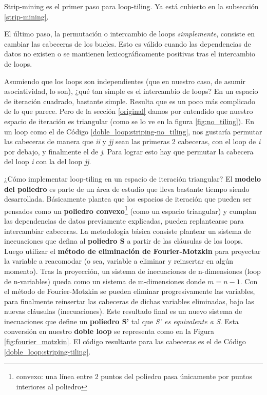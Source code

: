 \documentclass{article}
\begin{document}
Strip-mining es el primer paso para loop-tiling. Ya está cubierto en la subsección \ref{strip-mining}.


El último paso, la permutación o intercambio de loops \textit{simplemente}, consiste en cambiar las cabeceras de los bucles.
Esto es válido cuando las dependencias de datos no existen o se mantienen lexicográficamente positivas
tras el intercambio de loops.


Asumiendo que los loops son independientes (que en nuestro caso, de asumir asociatividad, lo son),
¿qué tan simple es el intercambio de loops? En un espacio de iteración cuadrado, bastante simple. Resulta
que es un poco más complicado de lo que parece. Pero de la sección \ref{original} damos por entendido que
nuestro espacio de iteración es triangular (como se lo ve en la figura \ref{fig:no_tiling}).
En un loop como el de Código \ref{doble_loop:striping-no_tiling}, nos gustaría permutar las cabeceras de manera que
\textit{ii} y \textit{jj} sean las primeras 2 cabeceras, con el loop de \textit{i} por debajo, y finalmente
el de \textit{j}. Para lograr esto hay que permutar la cabecera del loop \textit{i} con la del loop \textit{jj}.


¿Cómo implementar loop-tiling en un espacio de iteración triangular? El \textbf{modelo del poliedro} es parte
de un área de estudio que lleva bastante tiempo siendo desarrollada. Básicamente plantea que los espacios
de iteración que pueden ser pensados como un \textbf{poliedro convexo}\footnote{convexo: una línea entre 2 puntos
del poliedro pasa únicamente por puntos interiores al poliedro} (como un espacio triangular) y cumplan las dependencias
de datos previamente explicadas, pueden replantearse para intercambiar cabeceras. La metodología básica consiste
plantear un sistema de inecuaciones que defina al \textbf{poliedro S} a partir de las cláusulas de los loops. Luego utilizar
el \textbf{método de eliminación de Fourier-Motzkin} para proyectar la variable a reacomodar (o sea, variable a eliminar y
reinsertar en algún momento). Tras la proyección, un sistema de inecuaciones de n-dimensiones (loop de n-variables)
queda como un sistema de m-dimensiones donde $m=n-1$. Con el método de Fourier-Motzkin se pueden eliminar progresivamente las variables,
para finalmente reinsertar las cabeceras de dichas variables eliminadas, bajo las nuevas cláusulas (inecuaciones). Este resultado
final es un nuevo sistema de inecuaciones que define un \textbf{poliedro S'} tal que \textit{S' es equivalente a S}.
Esta conversión en nuestro \textbf{doble loop} se representa como en la Figura \ref{fig:fourier_motzkin}. El código
resultante para las cabeceras es el de Código \ref{doble_loop:striping-tiling}.
\end{document}
